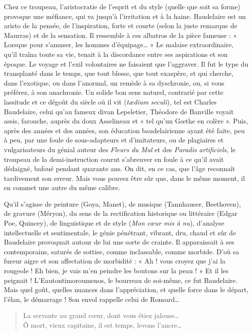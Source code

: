 \documentclass[french,twoside]{book} %
\begin{document}
Chez ce troupeau, l’aristocratie de l’esprit et du style (quelle que soit sa forme) provoque une méfiance, qui va jusqu’à l’irritation et à la haine. Baudelaire est un aristo de la pensée, de l’inspiration, forte et courte (selon la juste remarque de Maurras) et de la sensation. Il ressemble à ces albatros de la pièce fameuse : « Lorsque pour s’amuser, les hommes d’équipage… » Le malaise extraordinaire, qu’il traîna toute sa vie, tenait à la discordance entre ses aspirations et son époque. Le voyage et l’exil volontaires ne faisaient que l’aggraver. Il fut le type du transplanté dans le temps, que tout blesse, que tout exaspère, et qui cherche, dans l’exotique, ou dans l’anormal, un remède à sa dyschronie, ou, si vous préférez, à son anachronie. Un solide bon sens naturel, contrarié par cette lassitude et ce dégoût du siècle où il vit ({\itshape tædium seculi}), tel est Charles Baudelaire, celui qu’au fameux divan Lepeletier, Théodore de Banville voyait assis, farouche, auprès du doux Asselineau et « tel qu’un Gœthe en colère ». Puis, après des années et des années, son éducation baudelairienne ayant été faite, peu à peu, par une foule de sous-adapteurs et d’imitateurs, ou de plagiaires et vulgarisateurs du génial auteur des {\itshape Fleurs du Mal} et des {\itshape Paradis artificiels}, le troupeau de la demi-instruction courut s’abreuver en foule à ce qu’il avait dédaigné, bafoué pendant quarante ans. On dit, en ce cas, que l’âge reconnaît tardivement son erreur. Mais vous pouvez être sûr que, dans le même moment, il en commet une autre du même calibre.\par
Qu’il s’agisse de peinture (Goya, Manet), de musique (Tannhauser, Beethoven), de gravure (Méryon), du sens de la rectification historique ou littéraire (Edgar Poe, Quincey), de linguistique et de style ({\itshape Mon cœur mis à nu}), d’analyse intellectuelle et sentimentale, le génie pénétrant, vibrant, dru, chaud et sûr de Baudelaire provoquait autour de lui une sorte de crainte. Il apparaissait à ses contemporains, saturés de sottise, comme inclassable, comme morbide. D’où sa fureur aigre et son affectation de morbidité : « Ah ! vous croyez que j’ai la rougeole ! Eh bien, je vais m’en peindre les boutons sur la peau ! » Et il les peignait ! L’Eautontimoroumenos, le bourreau de soi-même, ce fut Baudelaire. Mais quel goût, quelles nuances dans l’appréciation, et quelle force dans le départ, l’élan, le démarrage ! Son envol rappelle celui de Ronsard…\par


\begin{verse}
La servante au grand cœur, dont vous étiez jalouse…\\
Ô mort, vieux capitaine, il est temps, levons l’ancre…\\
\end{verse}
\end{document}
